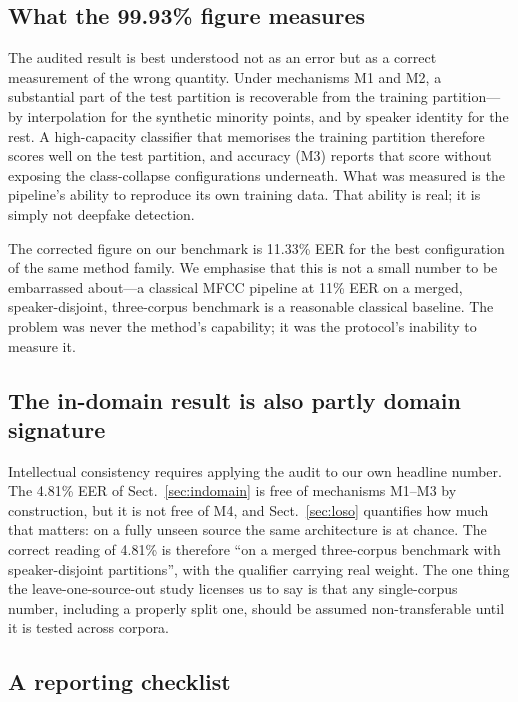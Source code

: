 \documentclass[sn-mathphys-num,pdflatex]{sn-jnl}
\begin{document}
\subsection{What the 99.93\% figure measures}\label{sec:whatitmeasures}

The audited result is best understood not as an error but as a correct
measurement of the wrong quantity. Under mechanisms M1 and M2, a substantial
part of the test partition is recoverable from the training partition---by
interpolation for the synthetic minority points, and by speaker identity for the
rest. A high-capacity classifier that memorises the training partition
therefore scores well on the test partition, and accuracy (M3) reports that
score without exposing the class-collapse configurations underneath. What was
measured is the pipeline's ability to reproduce its own training data. That
ability is real; it is simply not deepfake detection.

The corrected figure on our benchmark is 11.33\% EER for the best configuration
of the same method family. We emphasise that this is not a small number to be
embarrassed about---a classical MFCC pipeline at 11\% EER on a merged,
speaker-disjoint, three-corpus benchmark is a reasonable classical baseline.
The problem was never the method's capability; it was the protocol's inability
to measure it.

\subsection{The in-domain result is also partly domain signature}\label{sec:ourown}

Intellectual consistency requires applying the audit to our own headline number.
The 4.81\% EER of Sect.~\ref{sec:indomain} is free of mechanisms M1--M3 by
construction, but it is not free of M4, and Sect.~\ref{sec:loso} quantifies how
much that matters: on a fully unseen source the same architecture is at
chance. The correct reading of 4.81\% is therefore ``on a merged
three-corpus benchmark with speaker-disjoint partitions'', with the qualifier
carrying real weight. The one thing the leave-one-source-out study licenses us
to say is that any single-corpus number, including a properly split one, should
be assumed non-transferable until it is tested across corpora.

\subsection{A reporting checklist}\label{sec:checklist}
\end{document}
